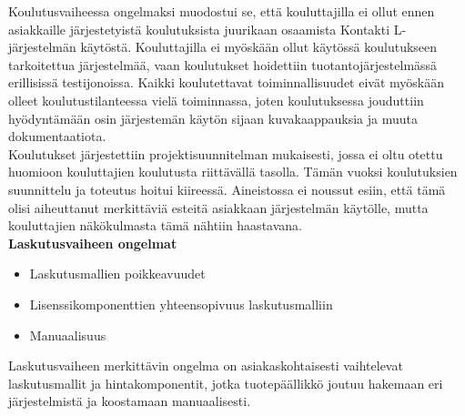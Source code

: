 \documentclass[finnish,12pt,a4paper,pdftex]{article}
\begin{document}
\noindent Koulutusvaiheessa ongelmaksi muodostui se, että kouluttajilla ei ollut ennen asiakkaille järjestetyistä koulutuksista juurikaan osaamista Kontakti L-järjestelmän käytöstä. Kouluttajilla ei myöskään ollut käytössä koulutukseen tarkoitettua järjestelmää, vaan koulutukset hoidettiin tuotantojärjestelmässä erillisissä testijonoissa. Kaikki koulutettavat toiminnallisuudet eivät myöskään olleet koulutustilanteessa vielä toiminnassa, joten koulutuksessa jouduttiin hyödyntämään osin järjestemän käytön sijaan kuvakaappauksia ja muuta dokumentaatiota.\\

\noindent Koulutukset järjestettiin projektisuunnitelman mukaisesti, jossa ei oltu otettu huomioon kouluttajien koulutusta riittävällä tasolla. Tämän vuoksi koulutuksien suunnittelu ja toteutus hoitui kiireessä. Aineistossa ei noussut esiin, että tämä olisi aiheuttanut merkittäviä esteitä asiakkaan järjestelmän käytölle, mutta kouluttajien näkökulmasta tämä nähtiin haastavana.\\

\textbf{Laskutusvaiheen ongelmat}\\

\begin{itemize}
    \item Laskutusmallien poikkeavuudet
    \item Lisenssikomponenttien yhteensopivuus laskutusmalliin
    \item Manuaalisuus
\end{itemize}

\noindent Laskutusvaiheen merkittävin ongelma on asiakaskohtaisesti vaihtelevat laskutusmallit ja hintakomponentit, jotka tuotepäällikkö joutuu hakemaan eri järjestelmistä ja koostamaan manuaalisesti. 


\end{document}
